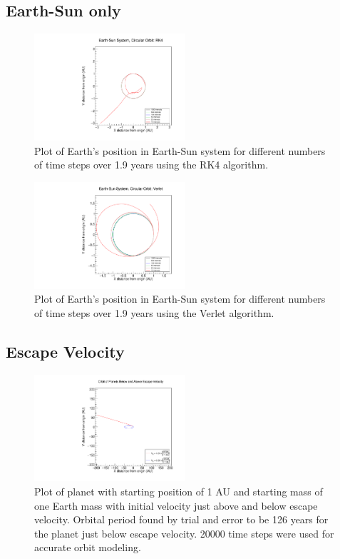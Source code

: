 \documentclass[a4paper,12pt]{report}
\begin{document}
\subsection{Earth-Sun only}

 \begin{figure}
 \centering
   \includegraphics[width=0.5\textwidth]{ESRK4_position.pdf}
  \caption{Plot of Earth's position in Earth-Sun system for different numbers of time steps over 1.9 years using the RK4 algorithm.}
  \label{fig:ESRK4_position}
 \end{figure}

  \begin{figure}
 \centering
   \includegraphics[width=0.5\textwidth]{ESVerlet_position.pdf}
  \caption{Plot of Earth's position in Earth-Sun system for different numbers of time steps over 1.9 years using the Verlet algorithm.}
  \label{fig:ESVerlet_position}
 \end{figure}


\subsection{Escape Velocity}

 \begin{figure}
 \centering
   \includegraphics[width=0.5\textwidth]{Escape_plot.pdf}
  \caption{Plot of planet with starting position of 1 AU and starting mass of one Earth mass with initial velocity just above and below escape velocity. Orbital period found by trial and error to be 126 years for the planet just below escape velocity. 20000 time steps were used for accurate orbit modeling.}
  \label{fig:Escape}
 \end{figure}
\end{document}
